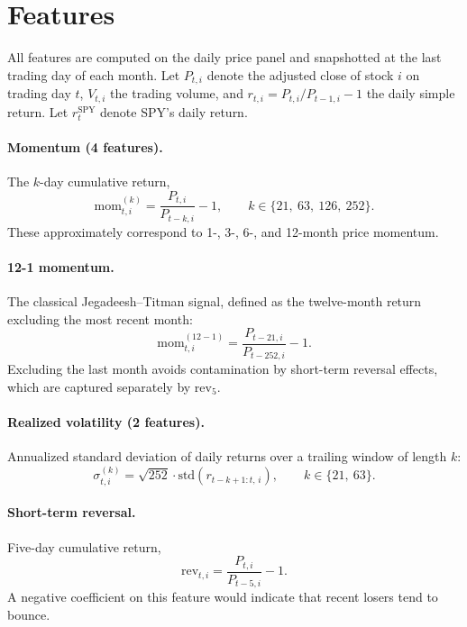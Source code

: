 \documentclass[11pt]{article}
\begin{document}
\section{Features}
\label{sec:features}
All features are computed on the daily price panel and snapshotted at the last trading
day of each month. Let $P_{t,i}$ denote the adjusted close of stock $i$ on trading day $t$,
$V_{t,i}$ the trading volume, and $r_{t,i} = P_{t,i}/P_{t-1,i} - 1$ the daily simple
return. Let $r^{\text{SPY}}_t$ denote SPY's daily return.

\paragraph{Momentum (4 features).} The $k$-day cumulative return,
\begin{equation}
\text{mom}^{(k)}_{t,i} = \frac{P_{t,i}}{P_{t-k,i}} - 1,
\qquad k \in \{21,\ 63,\ 126,\ 252\}.
\end{equation}
These approximately correspond to 1-, 3-, 6-, and 12-month price momentum.

\paragraph{12-1 momentum.} The classical Jegadeesh--Titman signal, defined as the
twelve-month return excluding the most recent month:
\begin{equation}
\text{mom}^{(12{-}1)}_{t,i} = \frac{P_{t-21,i}}{P_{t-252,i}} - 1.
\end{equation}
Excluding the last month avoids contamination by short-term reversal effects, which are
captured separately by rev$_5$.

\paragraph{Realized volatility (2 features).} Annualized standard deviation of daily
returns over a trailing window of length $k$:
\begin{equation}
\sigma^{(k)}_{t,i} = \sqrt{252} \cdot \mathrm{std}\!\left(r_{t-k+1:t,\,i}\right),
\qquad k \in \{21,\ 63\}.
\end{equation}

\paragraph{Short-term reversal.} Five-day cumulative return,
\begin{equation}
\text{rev}_{t,i} = \frac{P_{t,i}}{P_{t-5,i}} - 1.
\end{equation}
A negative coefficient on this feature would indicate that recent losers tend to bounce.
\end{document}

